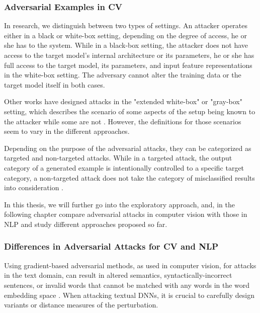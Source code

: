 \subsubsection{Adversarial Examples in CV}
In research, we distinguish between two types of settings.
An attacker operates either in a black or white-box setting, depending on the degree of access, he or she has to the system. While in a black-box setting, the attacker does not have access to the target model's internal architecture or its parameters, he or she has full access to the target model, its parameters, and input feature representations in the white-box setting. The adversary cannot alter the training data or the target model itself in both cases.

Other works have designed attacks in the "extended white-box" or "gray-box" setting, which describes the scenario of some aspects of the setup being known to the attacker while some are not \cite{vivek2018gray}. However, the definitions for those scenarios seem to vary in the different approaches.

Depending on the purpose of the adversarial attacks, they can be categorized as targeted and non-targeted attacks. While in a targeted attack, the output category of a generated example is intentionally controlled to a specific target category, a non-targeted attack does not take the category of misclassified results into consideration \cite{vijayaraghavan2019generating}.


\label{sec:adversarial_exapmles_in_text}

In this thesis, we will further go into the exploratory approach, and, in the following chapter compare adversarial attacks in computer vision with those in NLP and study different approaches proposed so far.

\subsubsection{Differences in Adversarial Attacks for CV and NLP }
\label{sec:differences_in_adv-ex}

Using gradient-based adversarial methods, as used in computer vision, for attacks in the text domain, can result in altered semantics, syntactically-incorrect sentences, or invalid words that cannot be matched with any words in the word embedding space \cite{zhang2019adversarial}. When attacking textual DNNs, it is crucial to carefully design variants or distance measures of the perturbation.

